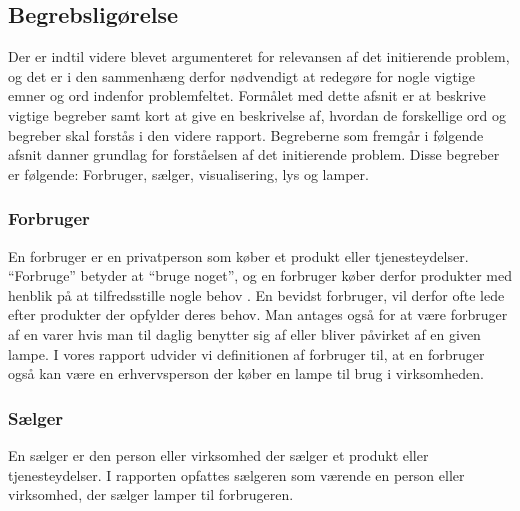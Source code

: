 \subsection{Begrebsligørelse}

Der er indtil videre blevet  argumenteret for relevansen af det initierende problem, og det er i den sammenhæng derfor nødvendigt at redegøre for nogle vigtige emner og ord indenfor problemfeltet. 
\newline Formålet med dette afsnit er at beskrive vigtige begreber samt kort at give en beskrivelse af, hvordan de forskellige ord og begreber skal forstås i den videre rapport. Begreberne som fremgår i følgende afsnit danner grundlag for forståelsen af det initierende problem. Disse begreber er følgende: Forbruger, sælger, visualisering, lys og lamper.


\subsubsection{Forbruger}
En forbruger er en privatperson som køber et produkt eller tjenesteydelser. “Forbruge” betyder at “bruge noget”, og en forbruger køber derfor produkter med henblik på at tilfredsstille nogle behov \cite{forbrugerportalen}. En bevidst forbruger, vil derfor ofte lede efter produkter der opfylder deres behov. Man antages også for at være forbruger af en varer hvis man til daglig benytter sig af eller bliver påvirket af en given lampe.
\newline I vores rapport udvider vi definitionen af forbruger til, at en forbruger også kan være en erhvervsperson der køber en lampe til brug i virksomheden.

\subsubsection{Sælger}
En sælger er den person eller virksomhed der sælger et produkt eller tjenesteydelser. I rapporten opfattes sælgeren som værende en person eller virksomhed, der sælger lamper til forbrugeren. 


